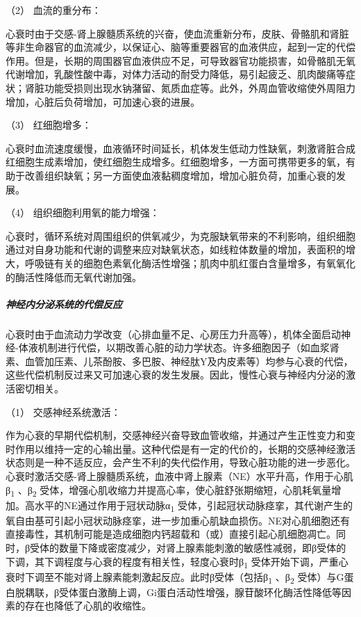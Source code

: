 \hypertarget{text00072.htmlux5cux23CHP3-3-1-2-2-2-2}{}
（2） 血流的重分布：

心衰时由于交感-肾上腺髓质系统的兴奋，使血流重新分布，皮肤、骨骼肌和肾脏等非生命器官的血流减少，以保证心、脑等重要器官的血液供应，起到一定的代偿作用。但是，长期的周围器官血液供应不足，可导致器官功能损害，如骨骼肌无氧代谢增加，乳酸性酸中毒，对体力活动的耐受力降低，易引起疲乏、肌肉酸痛等症状；肾脏功能受损则出现水钠潴留、氮质血症等。此外，外周血管收缩使外周阻力增加，心脏后负荷增加，可加速心衰的进展。

\hypertarget{text00072.htmlux5cux23CHP3-3-1-2-2-2-3}{}
（3） 红细胞增多：

心衰时血流速度缓慢，血液循环时间延长，机体发生低动力性缺氧，刺激肾脏合成红细胞生成素增加，使红细胞生成增多。红细胞增多，一方面可携带更多的氧，有助于改善组织缺氧；另一方面使血液黏稠度增加，增加心脏负荷，加重心衰的发展。

\hypertarget{text00072.htmlux5cux23CHP3-3-1-2-2-2-4}{}
（4） 组织细胞利用氧的能力增强：

心衰时，循环系统对周围组织的供氧减少，为克服缺氧带来的不利影响，组织细胞通过对自身功能和代谢的调整来应对缺氧状态，如线粒体数量的增加，表面积的增大，呼吸链有关的细胞色素氧化酶活性增强；肌肉中肌红蛋白含量增多，有氧氧化的酶活性降低而无氧代谢加强。

\subparagraph{神经内分泌系统的代偿反应}

心衰时由于血流动力学改变（心排血量不足、心房压力升高等），机体全面启动神经-体液机制进行代偿，以期改善心脏的动力学状态。许多细胞因子（如血浆肾素、血管加压素、儿茶酚胺、多巴胺、神经肽Y及内皮素等）均参与心衰的代偿，这些代偿机制反过来又可加速心衰的发生发展。因此，慢性心衰与神经内分泌的激活密切相关。

\hypertarget{text00072.htmlux5cux23CHP3-3-1-2-2-3-1}{}
（1） 交感神经系统激活：

作为心衰的早期代偿机制，交感神经兴奋导致血管收缩，并通过产生正性变力和变时作用以维持一定的心输出量。这种代偿是有一定的代价的，长期的交感神经激活状态则是一种不适反应，会产生不利的失代偿作用，导致心脏功能的进一步恶化。心衰时激活交感-肾上腺髓质系统，血液中肾上腺素（NE）水平升高，作用于心肌β\textsubscript{1}
、β\textsubscript{2}
受体，增强心肌收缩力并提高心率，使心脏舒张期缩短，心肌耗氧量增加。高水平的NE通过作用于冠状动脉α\textsubscript{1}
受体，引起冠状动脉痉挛，其代谢产生的氧自由基可引起小冠状动脉痉挛，进一步加重心肌缺血损伤。NE对心肌细胞还有直接毒性，其机制可能是造成细胞内钙超载和（或）直接引起心肌细胞凋亡。同时，β受体的数量下降或密度减少，对肾上腺素能刺激的敏感性减弱，即β受体的下调，其下调程度与心衰的程度有相关性，轻度心衰时β\textsubscript{1}
受体开始下调，严重心衰时下调至不能对肾上腺素能刺激起反应。此时β受体（包括β\textsubscript{1}
、β\textsubscript{2}
受体）与G蛋白脱耦联，β受体蛋白激酶上调，Gi蛋白活动性增强，腺苷酸环化酶活性降低等因素的存在也降低了心肌的收缩性。

